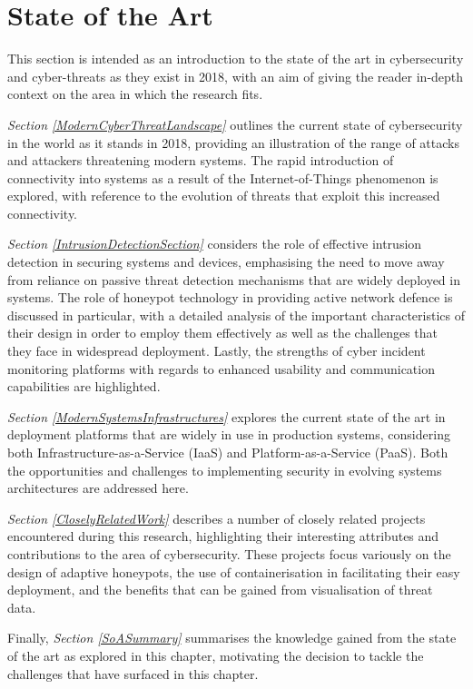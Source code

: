 \chapter{State of the Art} \label{Chapter2}

This section is intended as an introduction to the state of the art in cybersecurity and cyber-threats as they exist in 2018, with an aim of giving the reader in-depth context on the area in which the research fits.

\textit{Section \ref{ModernCyberThreatLandscape}} outlines the current state of cybersecurity in the world as it stands in 2018, providing an illustration of the range of attacks and attackers threatening modern systems. The rapid introduction of connectivity into systems as a result of the Internet-of-Things phenomenon  is explored, with reference to the evolution of threats that exploit this increased connectivity.

\textit{Section \ref{IntrusionDetectionSection}} considers the role of effective intrusion detection in securing systems and devices, emphasising the need to move away from reliance on passive threat detection mechanisms that are widely deployed in systems. The role of honeypot technology in providing active network defence is discussed in particular, with a detailed analysis of the important characteristics of their design in order to employ them effectively as well as the challenges that they face in widespread deployment. Lastly, the strengths of cyber incident monitoring platforms with regards to enhanced usability and communication capabilities are highlighted.

\textit{Section \ref{ModernSystemsInfrastructures}} explores the current state of the art in deployment platforms that are widely in use in production systems, considering both Infrastructure-as-a-Service (IaaS) and Platform-as-a-Service (PaaS). Both the opportunities and challenges to implementing security in evolving systems architectures are addressed here.

\textit{Section \ref{CloselyRelatedWork}} describes a number of closely related projects encountered during this research, highlighting their interesting attributes and contributions to the area of cybersecurity. These projects focus variously on the design of adaptive honeypots, the use of containerisation in facilitating their easy deployment, and the benefits that can be gained from visualisation of threat data.

Finally, \textit{Section \ref{SoASummary}} summarises the knowledge gained from the state of the art as explored in this chapter, motivating the decision to tackle the challenges that have surfaced in this chapter.

